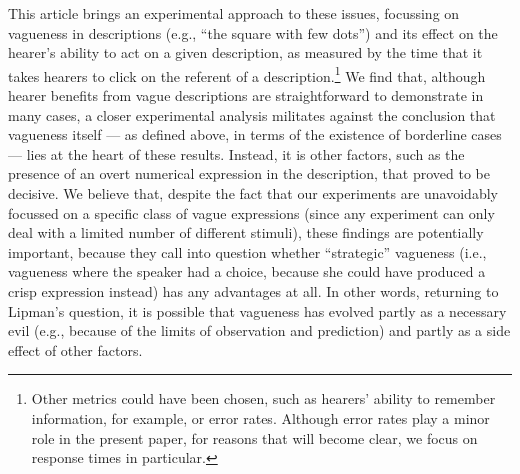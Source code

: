 \documentclass[ %
  graybox       %
 ,envcountchap  %
 ,sectrefs      %
]{svmono}
\begin{document}
This article brings an experimental approach to these issues, focussing on vagueness in descriptions (e.g., ``the square with few dots'') and its effect on the hearer's ability to act on a given description, as measured by the time that it takes hearers to click on the referent of a description.\footnote{Other metrics could have been chosen, such as hearers' ability to remember information, for example, or error rates. Although error rates play a minor role in the present paper, for reasons that will become clear, we focus on response times in particular.}
We find that, although hearer benefits from vague descriptions are straightforward to demonstrate in many cases, a closer experimental analysis militates against the conclusion that vagueness itself --- as defined above, in terms of the existence of borderline cases --- lies at the heart of these results.
Instead, it is other factors, such as the presence of an overt numerical expression in the description, that proved to be decisive.
We believe that, despite the fact that our experiments are unavoidably focussed on a specific class of vague expressions (since any experiment can only deal with a limited number of different stimuli), these findings are potentially important, because they call into question whether ``strategic'' vagueness (i.e., vagueness where the speaker had a choice, because she could have produced a crisp expression instead) has any advantages at all.
In other words, returning to Lipman's question, it is possible that vagueness has evolved partly as a necessary evil (e.g., because of the limits of observation and prediction) and partly as a side effect of other factors.
\end{document}
